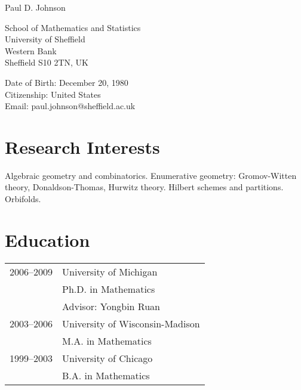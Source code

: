 \documentclass[11pt,letterpaper]{article}
\def\name{Paul D. Johnson}
\renewenvironment{itemize}{
  \begin{list}{}{
    \setlength{\leftmargin}{1.5em}
  }
}{
  \end{list}
}
\begin{document}
{\huge \name}


\vspace{0.25in}

\begin{minipage}[t]{0.5\textwidth}
School of Mathematics and Statistics \\
University of Sheffield \\
Western Bank \\
Sheffield S10 2TN, UK
\end{minipage}
\begin{minipage}[t]{0.5\textwidth}
  Date of Birth: December 20, 1980 \\
  Citizenship: United States \\
  Email: paul.johnson@sheffield.ac.uk
  \end{minipage}

\section*{Research Interests}
\begin{itemize}
\item Algebraic geometry and combinatorics.  Enumerative geometry: Gromov-Witten theory, Donaldson-Thomas, Hurwitz theory.  Hilbert schemes and partitions.  Orbifolds.
\end{itemize}

\section*{Education}
\begin{tabular}{rl}
   2006--2009 & University of Michigan \\
  & Ph.D. in Mathematics \\
  & Advisor: Yongbin Ruan \\
  \rule{0pt}{3ex}2003--2006 &  University of Wisconsin-Madison\\
  & M.A. in Mathematics \\
  \rule{0pt}{3ex}1999--2003 &  University of Chicago \\
  & B.A. in Mathematics \\


\end{tabular}
\end{document}
